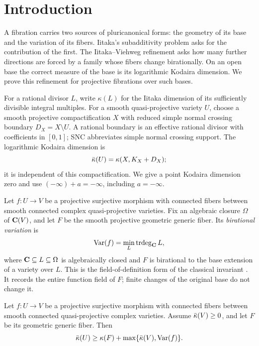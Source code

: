 \section{Introduction}\label{intro:section}

A fibration carries two sources of pluricanonical forms: the geometry
of its base and the variation of its fibers. Iitaka's subadditivity
problem asks for the contribution of the first. The Iitaka--Viehweg
refinement asks how many further directions are forced by a family
whose fibers change birationally. On an open base the correct measure
of the base is its logarithmic Kodaira dimension. We prove this
refinement for projective fibrations over such bases.

For a rational divisor $L$, write $\kappa(L)$ for the Iitaka dimension
of its sufficiently divisible integral multiples. For a smooth
quasi-projective variety $U$, choose a smooth projective compactification
$X$ with reduced simple normal crossing boundary $D_X=X\setminus U$.
A rational boundary is an effective rational divisor with coefficients
in $[0,1]$; SNC abbreviates simple normal crossing support. The
logarithmic Kodaira dimension is
\[
             \bar\kappa(U)=\kappa(X,K_X+D_X);
\]
it is independent of this compactification. We give a point Kodaira
dimension zero and use $(-\infty)+a=-\infty$, including
$a=-\infty$.

Let $f:U\to V$ be a projective surjective morphism with connected
fibers between smooth connected complex quasi-projective varieties.
Fix an algebraic closure $\Omega$ of $\mathbf C(V)$, and let $F$ be the smooth
projective geometric generic fiber. Its \emph{birational variation} is
\begin{equation}\label{eq:variation-definition}
 \operatorname{Var}(f)=\min_L\operatorname{trdeg}_{\mathbf C}L,
\end{equation}
where $\mathbf C\subseteq L\subseteq\Omega$ is algebraically closed and
$F$ is birational to the base extension of a variety over $L$.
This is the field-of-definition form of the classical invariant
\cite{ViehwegAdditivity,KawamataKodaira}. It records the entire function field of $F$;
finite changes of the original base do not change it.

\begin{theorem}\label{thm:main}
Let $f:U\to V$ be a projective surjective morphism with connected fibers
between smooth connected quasi-projective complex varieties.
Assume $\bar\kappa(V)\geq0$, and let $F$ be its geometric generic fiber.
Then
\begin{equation}\label{eq:main}
 \bar\kappa(U)\geq\kappa(F)+\max\{\bar\kappa(V),\operatorname{Var}(f)\}.
\end{equation}
\end{theorem}

